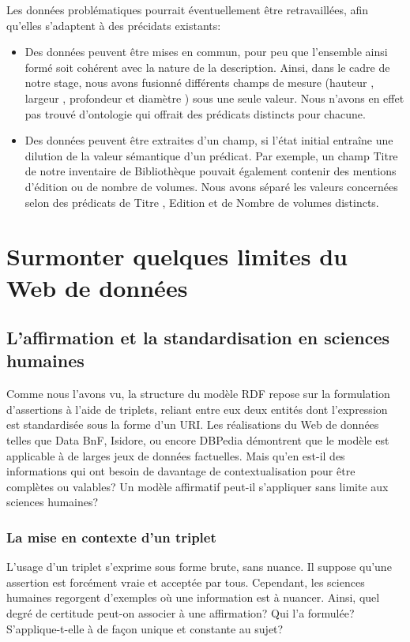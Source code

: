 \documentclass[a4paper,12pt,twoside]{book}
\begin{document}
Les données problématiques pourrait éventuellement être retravaillées, afin qu'elles s'adaptent à des précidats existants:
\begin{itemize}
    \item Des données peuvent être mises en commun, pour peu que l'ensemble ainsi formé soit cohérent avec la nature de la description. Ainsi, dans le cadre de notre stage, nous avons fusionné différents champs de mesure (\og hauteur \fg, \og largeur \fg, \og profondeur \fg{} et \og diamètre \fg) sous une seule valeur. Nous n'avons en effet pas trouvé d'ontologie qui offrait des prédicats distincts pour chacune.
    \item Des données peuvent être extraites d'un champ, si l'état initial entraîne une dilution de la valeur sémantique d'un prédicat. Par exemple, un champ \og Titre \fg{} de notre inventaire de Bibliothèque pouvait également contenir des mentions d'édition ou de nombre de volumes. Nous avons séparé les valeurs concernées selon des prédicats de \og Titre \fg, \og Edition \fg{} et de \og Nombre de volumes \fg{} distincts. 
\end{itemize}


\chapter{Surmonter quelques limites du Web de données}


\section{L'affirmation et la standardisation en sciences humaines}
Comme nous l'avons vu, la structure du modèle RDF repose sur la formulation d'assertions à l'aide de triplets, reliant entre eux deux entités dont l'expression est standardisée sous la forme d'un URI. Les réalisations du Web de données telles que Data BnF, Isidore, ou encore DBPedia démontrent que le modèle est applicable à de larges jeux de données factuelles. Mais qu'en est-il des informations qui ont besoin de davantage de contextualisation pour être complètes ou valables? Un modèle affirmatif peut-il s'appliquer sans limite aux sciences humaines? 

\subsection{La mise en contexte d'un triplet}
L'usage d'un triplet s'exprime sous forme brute, sans nuance. Il suppose qu'une assertion est forcément vraie et acceptée par tous. Cependant, les sciences humaines regorgent d'exemples où une information est à nuancer. Ainsi, quel degré de certitude peut-on associer à une affirmation? Qui l'a formulée? S'applique-t-elle à de façon unique et constante au sujet?\\
\end{document}
